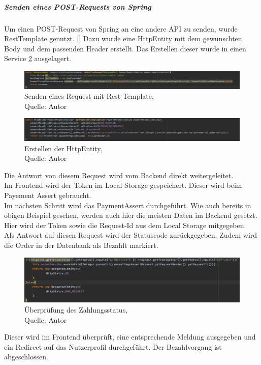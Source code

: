\subparagraph{Senden eines POST-Requests von Spring}
Um einen POST-Request von Spring an eine andere API zu senden, wurde RestTemplate genutzt. [\cite{restTemplate}] Dazu wurde eine HttpEntity mit dem gewünschten Body und dem passenden Header erstellt. Das Erstellen dieser wurde in einen Service \ref{img: httpEntity} ausgelagert. 
\begin{figure}[H]
	\includegraphics[width=1\textwidth]{images/restTemplate.PNG}
	\caption[Senden eines Request mit Rest Template]{Senden eines Request mit Rest Template,\\ Quelle: Autor}
	\label{img: restTemplate}
\end{figure}
\begin{figure}[H]
	\includegraphics[width=1\textwidth]{images/httpEntity.PNG}
	\caption[Erstellen der HttpEntity]{Erstellen der HttpEntity,\\ Quelle: Autor}
	\label{img: httpEntity}
\end{figure}

Die Antwort von diesem Request wird vom Backend direkt weitergeleitet. \\Im Frontend wird der Token im Local Storage gespeichert. Dieser wird beim Payement Assert gebraucht.
\\
Im nächsten Schritt wird das PaymentAssert durchgeführt. Wie auch bereits in obigen Beispiel gesehen, werden auch hier die meisten Daten im Backend gesetzt. Hier wird der Token sowie die Request-Id aus dem Local Storage mitgegeben. \\
Als Antwort auf diesen Request wird der Statuscode zurückgegeben. Zudem wird die Order in der Datenbank als Bezahlt markiert. 
 \begin{figure}[H]
	\centering
	\includegraphics[width=1\textwidth]{images/pageAssertReturn.PNG}
	\caption[Überprüfung des Zahlungsstatus]{Überprüfung des Zahlungsstatus,\\ Quelle: Autor}
	\label{img: pageAssertReturn}
\end{figure} 
Dieser wird im Frontend überprüft, eine entsprechende Meldung ausgegeben und ein Redirect auf das Nutzerprofil durchgeführt. Der Bezahlvorgang ist abgeschlossen. 
\newpage
